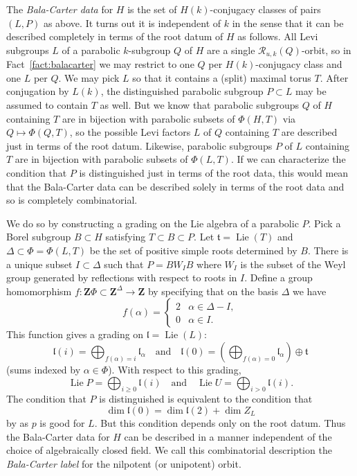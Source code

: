 \documentclass[11pt, letterpaper,english]{amsart}
\theoremstyle{plain}
\theoremstyle{definition}
\numberwithin{equation}{section}
\numberwithin{lem}{section}
\newcommand{\mathfont}{\mathbf}
\newcommand{\ZZ}{\mathfont Z}
\newcommand{\fl}{\mathfrak{l}}
\newcommand{\ft}{\mathfrak{t}}
\DeclareMathOperator{\Lie}{Lie}
\begin{document}
The \emph{Bala-Carter data} for $H$ is the set of $H(k)$-conjugacy classes of pairs $(L,P)$ as above.  It turns out it is independent of $k$ in the sense that it can be described completely in terms of the root datum of $H$ as follows.  All Levi subgroups $L$ of a parabolic $k$-subgroup $Q$ of $H$ are a single $\mathcal{R}_{u,k}(Q)$-orbit, so in Fact~\ref{fact:balacarter} we may restrict to one $Q$ per $H(k)$-conjugacy class and one $L$ per $Q$.  We may pick $L$ so that it contains a (split) maximal torus $T$.  After conjugation by $L(k)$, the distinguished parabolic subgroup $P \subset L$ may be assumed to contain $T$ as well.  But we know that parabolic subgroups $Q$ of $H$ containing $T$ are in bijection with parabolic subsets of $\Phi(H,T)$ via $Q \mapsto \Phi(Q,T)$, so the possible Levi factors $L$ of $Q$ containing $T$ are described just in terms of the root datum.  Likewise, parabolic subgroups $P$ of $L$ containing $T$ are in bijection with parabolic subsets of $\Phi(L,T)$.  If we can 
characterize the condition 
that $P$ is distinguished just in terms of the root 
data, this would mean that the Bala-Carter data can be described solely in terms of the root data and so is completely combinatorial. 

We do so by constructing a grading on the Lie algebra of a parabolic $P$.  Pick a Borel subgroup $B \subset H$ satisfying $T \subset B \subset P$.  Let $\ft = \Lie(T)$ and $\Delta \subset \Phi = \Phi(L,T)$ be the set of positive simple roots determined by $B$.  There is a unique subset $I \subset \Delta$ such that $P = B W_I B$ where $W_I$ is the subset of the Weyl group generated by reflections with respect to roots in $I$.  Define a group homomorphism $f: \ZZ \Phi \subset \ZZ^\Delta \to \ZZ$ by specifying that on the basis $\Delta$ we have
\[
 f(\alpha) = \begin{cases}
              2 & \alpha \in \Delta - I, \\
              0 & \alpha \in I.
             \end{cases}
\]
This function gives a grading on $\fl = \Lie(L)$:
\[
\fl(i) = \bigoplus_{f(\alpha) = i} \fl_\alpha \quad \text{and} \quad \fl(0) = \left( \bigoplus_{f(\alpha) = 0} \fl_\alpha \right) \oplus \ft
\]
(sums indexed by $\alpha \in \Phi$).  With respect to this grading,
\[
 \Lie P = \bigoplus_{i \geq 0} \fl(i) \quad \text{and}\quad \Lie U = \bigoplus_{i >0 } \fl(i).
\]
The condition that $P$ is distinguished is equivalent to the condition that
\[
 \dim \fl(0) = \dim \fl(2) + \dim Z_{L}
\]
by \cite[Corollary 5.8.3]{carter85} as $p$ is good for $L$.  But this condition depends only on the root datum.  Thus the Bala-Carter data for $H$ can be described in a manner independent of the choice of algebraically closed field.  We call this combinatorial description the \emph{Bala-Carter label} for the nilpotent (or unipotent) orbit.
\end{document}
